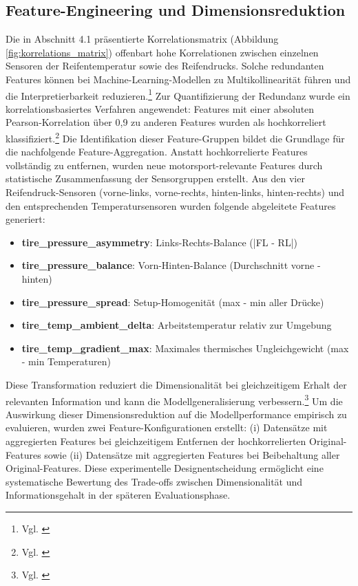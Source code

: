 \subsection{Feature-Engineering und Dimensionsreduktion}

Die in Abschnitt 4.1 präsentierte Korrelationsmatrix (Abbildung \ref{fig:korrelations_matrix}) offenbart hohe Korrelationen zwischen einzelnen Sensoren der Reifentemperatur sowie des Reifendrucks. Solche redundanten Features können bei Machine-Learning-Modellen zu Multikollinearität führen und die Interpretierbarkeit reduzieren.\footnote{Vgl. \cite{Tsanas2022}} 
Zur Quantifizierung der Redundanz wurde ein korrelationsbasiertes Verfahren angewendet: Features mit einer absoluten Pearson-Korrelation über 0,9 zu anderen Features wurden als hochkorreliert klassifiziert.\footnote{Vgl. \cite{Farek2024}} Die Identifikation dieser Feature-Gruppen bildet die Grundlage für die nachfolgende Feature-Aggregation.
Anstatt hochkorrelierte Features vollständig zu entfernen, wurden neue motorsport-relevante Features durch statistische Zusammenfassung der Sensorgruppen erstellt. Aus den vier Reifendruck-Sensoren (vorne-links, vorne-rechts, hinten-links, hinten-rechts) und den entsprechenden Temperatursensoren wurden folgende abgeleitete Features generiert:

\begin{itemize}
  \item \textbf{tire\_pressure\_asymmetry}: Links-Rechts-Balance (|FL - RL|)
  \item \textbf{tire\_pressure\_balance}: Vorn-Hinten-Balance (Durchschnitt vorne - hinten)
  \item \textbf{tire\_pressure\_spread}: Setup-Homogenität (max - min aller Drücke)
  \item \textbf{tire\_temp\_ambient\_delta}: Arbeitstemperatur relativ zur Umgebung
  \item \textbf{tire\_temp\_gradient\_max}: Maximales thermisches Ungleichgewicht (max - min Temperaturen)
\end{itemize} Diese Transformation reduziert die Dimensionalität bei gleichzeitigem Erhalt der relevanten Information und kann die Modellgeneralisierung verbessern.\footnote{Vgl. \cite{Tsanas2022}}
Um die Auswirkung dieser Dimensionsreduktion auf die Modellperformance empirisch zu evaluieren, wurden zwei Feature-Konfigurationen erstellt: (i) Datensätze mit aggregierten Features bei gleichzeitigem Entfernen der hochkorrelierten Original-Features sowie (ii) Datensätze mit aggregierten Features bei Beibehaltung aller Original-Features. Diese experimentelle Designentscheidung ermöglicht eine systematische Bewertung des Trade-offs zwischen Dimensionalität und Informationsgehalt in der späteren Evaluationsphase.

